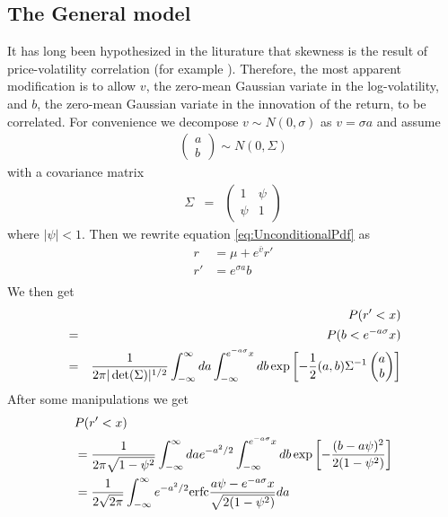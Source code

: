 \subsection{The General model}\label{sec:SLV_Asymmetric}
It has long been hypothesized in the liturature that skewness is the
result of price-volatility correlation (for example
\cite{Potters2003}). Therefore, the most apparent modification is to
allow $v$, the zero-mean Gaussian variate in the log-volatility, and
$b$, the zero-mean Gaussian variate in the innovation of the return,
to be correlated. For convenience we decompose $v \sim N(0, \sigma)$
as $v = \sigma a$ and assume
\begin{eqnarray*}
  \begin{pmatrix}
    a \\
    b
  \end{pmatrix} \sim N(0, \Sigma)
\end{eqnarray*}
with a covariance matrix
\begin{eqnarray*}
    \Sigma &=&
  \begin{pmatrix}
    1 & \psi \\
    \psi & 1
  \end{pmatrix}
\end{eqnarray*}
where $|\psi| < 1$. Then we rewrite equation \ref{eq:UnconditionalPdf}
as
\begin{equation}
  \label{eq:r_t}
  \begin{aligned}
    r &= \mu + e^{\bar{v}} r' \\
    r' &= e^{\sigma a} b \\
  \end{aligned}
\end{equation}
We then get
\begin{eqnarray*}
  && P(r' < x)\\
  &=& P(b < e^{-a\sigma}x) \\
  &=& {1 \over 2\pi |\det(\Sigma)|^{1/2}}
  \int_{-\infty}^{\infty} da \int_{-\infty}^{e^{-a\sigma}x} db
  \exp\left[
    -{1 \over 2} (a, b) \Sigma^{-1}
    \begin{pmatrix}
      a \\
      b
    \end{pmatrix}
  \right] \\
\end{eqnarray*}
After some manipulations we get
\begin{equation}\label{eq:UncondCDFAsymmetric}
  \begin{aligned}
    & P(r' < x) \\  
    &= {1 \over 2\pi \sqrt{1 - \psi^2}} \int_{-\infty}^{\infty} da
    e^{-a^2/2} \int_{-\infty}^{e^{-a\sigma}x} db
    \exp\left[
      - {(b - a\psi)^2 \over 2(1 - \psi^2)}
    \right] \\
    &= {1 \over 2\sqrt{2\pi}} \int_{-\infty}^{\infty} e^{-a^2/2}
    \text{erfc}{a\psi - e^{-a\sigma} x \over \sqrt{2(1-\psi^2)}} da
  \end{aligned}
\end{equation}

